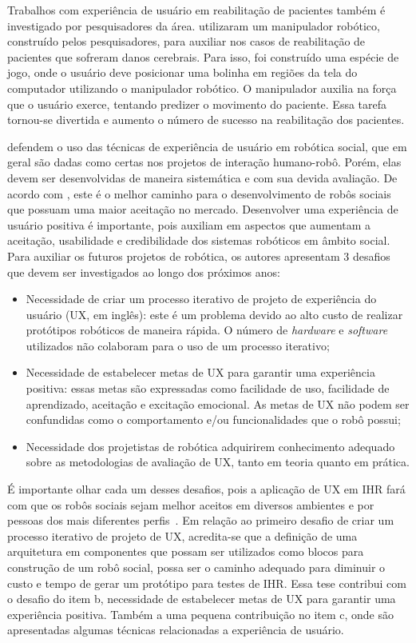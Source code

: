 Trabalhos com experiência de usuário em reabilitação de pacientes também é investigado por pesquisadores da área. \textcite{shirzad:2016} utilizaram um manipulador robótico, construído pelos pesquisadores, para auxiliar nos casos de reabilitação de pacientes que sofreram danos cerebrais. Para isso, foi construído uma espécie de jogo, onde o usuário deve posicionar uma bolinha em regiões da tela do computador utilizando o manipulador robótico. O manipulador auxilia na força que o usuário exerce, tentando predizer o movimento do paciente. Essa tarefa tornou-se divertida e aumento o número de sucesso na reabilitação dos pacientes.

\textcite{lindblom:2016} defendem o uso das técnicas de experiência de usuário em robótica social, que em geral são dadas como certas nos projetos de interação humano-robô. Porém, elas devem ser desenvolvidas de maneira sistemática e com sua devida avaliação. De acordo com \textcite{lindblom:2016}, este é o melhor caminho para o desenvolvimento de robôs sociais que possuam uma maior aceitação no mercado. Desenvolver uma experiência de usuário positiva é importante, pois auxiliam em aspectos que aumentam a aceitação, usabilidade e credibilidade dos sistemas robóticos em âmbito social. Para auxiliar os futuros projetos de robótica, os autores apresentam 3 desafios que devem ser investigados ao longo dos próximos anos:

\begin{itemize}
    \item Necessidade de criar um processo iterativo de projeto de experiência do usuário (UX, em inglês): este é um problema devido ao alto custo de realizar protótipos robóticos de maneira rápida. O número de \emph{hardware} e \emph{software} utilizados não colaboram para o uso de um processo iterativo;
    \item Necessidade de estabelecer metas de UX para garantir uma experiência positiva: essas metas são expressadas como facilidade de uso, facilidade de aprendizado, aceitação e excitação emocional. As metas de UX não podem ser confundidas como o comportamento e/ou funcionalidades que o robô possui;
    \item Necessidade dos projetistas de robótica adquirirem conhecimento adequado sobre as metodologias de avaliação de UX, tanto em teoria quanto em prática.
\end{itemize}

É importante olhar cada um desses desafios, pois a aplicação de UX em IHR fará com que os robôs sociais sejam melhor aceitos em diversos ambientes e por pessoas dos mais diferentes perfis~\cite{lindblom:2016}. Em relação ao primeiro desafio de criar um processo iterativo de projeto de UX, acredita-se que a definição de uma arquitetura em componentes que possam ser utilizados como blocos para construção de um robô social, possa ser o caminho adequado para diminuir o custo e tempo de gerar um protótipo para testes de IHR. Essa tese contribui com o desafio do item b, necessidade de estabelecer metas de UX para garantir uma experiência positiva. Também a uma pequena contribuição no item c, onde são apresentadas algumas técnicas relacionadas a experiência de usuário.

